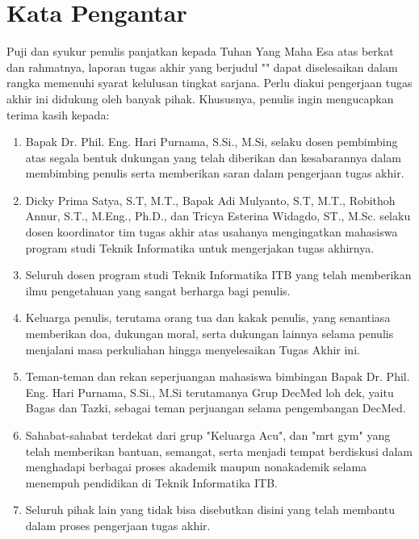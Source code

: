 \chapter*{Kata Pengantar}

Puji dan syukur penulis panjatkan kepada Tuhan Yang Maha Esa atas berkat dan rahmatnya, laporan tugas akhir yang berjudul "\thetitle" dapat diselesaikan dalam rangka memenuhi syarat kelulusan tingkat sarjana. Perlu diakui pengerjaan tugas akhir ini didukung oleh banyak pihak. Khususnya, penulis ingin mengucapkan terima kasih kepada:

\begin{enumerate}
	\item Bapak Dr. Phil. Eng. Hari Purnama, S.Si., M.Si, selaku dosen pembimbing atas segala bentuk dukungan yang telah diberikan dan kesabarannya dalam membimbing penulis serta memberikan saran dalam pengerjaan tugas akhir.
	\item Dicky Prima Satya, S.T, M.T., Bapak Adi Mulyanto, S.T, M.T., Robithoh Annur, S.T., M.Eng., Ph.D., dan Tricya Esterina Widagdo, ST., M.Sc. selaku dosen koordinator tim tugas akhir atas usahanya mengingatkan mahasiswa program studi Teknik Informatika untuk mengerjakan tugas akhirnya.
	\item Seluruh dosen program studi Teknik Informatika ITB yang telah memberikan ilmu pengetahuan yang sangat berharga bagi penulis.
	\item Keluarga penulis, terutama orang tua dan kakak penulis, yang senantiasa memberikan doa, dukungan moral, serta dukungan lainnya selama penulis menjalani masa perkuliahan hingga menyelesaikan Tugas Akhir ini.
	\item Teman-teman dan rekan seperjuangan mahasiswa bimbingan Bapak Dr. Phil. Eng. Hari Purnama, S.Si., M.Si terutamanya Grup DecMed loh dek, yaitu Bagas dan Tazki, sebagai teman perjuangan selama pengembangan DecMed.
	\item Sahabat-sahabat terdekat dari grup "Keluarga Acu", dan "mrt gym" yang telah memberikan bantuan, semangat, serta menjadi tempat berdiskusi dalam menghadapi berbagai proses akademik maupun nonakademik selama menempuh pendidikan di Teknik Informatika ITB.
	\item Seluruh pihak lain yang tidak bisa disebutkan disini yang telah membantu dalam proses pengerjaan tugas akhir.
\end{enumerate}

